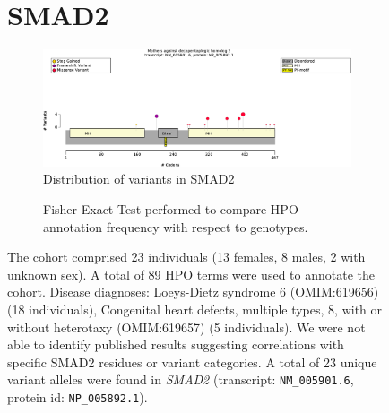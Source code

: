 

\begin{figure}[htbp]
    \section*{SMAD2}
\centering
\begin{subfigure}[b]{0.95\textwidth}
\centering
\includegraphics[width=\textwidth]{ img/SMAD2_protein_diagram.pdf} 
\captionsetup{justification=raggedright,singlelinecheck=false}
\caption{Distribution of variants in SMAD2}
\end{subfigure}

\vspace{2em}

\begin{subfigure}[b]{0.95\textwidth}
\centering
{}
\captionsetup{justification=raggedright,singlelinecheck=false}
\caption{Fisher Exact Test performed to compare HPO annotation frequency with respect to genotypes.}
\end{subfigure}

\vspace{2em}

\caption{ The cohort comprised 23 individuals (13 females, 8 males, 2 with unknown sex). A total of 89 HPO terms were used to annotate the cohort. Disease diagnoses: Loeys-Dietz syndrome 6 (OMIM:619656) (18 individuals), Congenital heart defects, multiple types, 8, with or without heterotaxy (OMIM:619657) (5 individuals). We were not able to identify published results suggesting correlations with specific SMAD2 residues or variant categories. A total of 23 unique variant alleles were found in \textit{SMAD2} (transcript: \texttt{NM\_005901.6}, protein id: \texttt{NP\_005892.1}).}
\end{figure}
